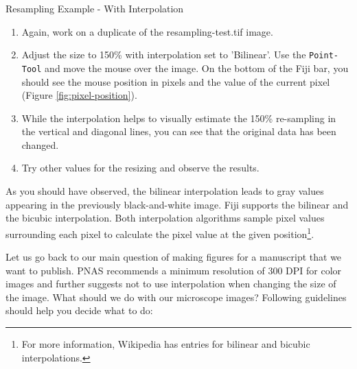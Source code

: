 \newpage
\begin{taskbox}{Resampling Example - With Interpolation}

\begin{enumerate}
	\item Again, work on a duplicate of the resampling-test.tif image.
	\item Adjust the size to 150\% with interpolation set to 'Bilinear'. Use the \texttt{Point-Tool} and move the mouse over the image. On the bottom of the Fiji bar, you should see the mouse position in pixels and the value of the current pixel (Figure \ref{fig:pixel-position}).
	
	\begin{minipage}[t]{\linewidth}
		\begin{center}
		\medskip
		\label{fig:pixel-position}
		\end{center}
	\end{minipage}
	
	\item While the interpolation helps to visually estimate the 150\% re-sampling in the vertical and diagonal lines, you can see that the original data has been changed.
	\item Try other values for the resizing and observe the results.
\end{enumerate}
\end{taskbox}

As you should have observed, the bilinear interpolation leads to gray values appearing in the previously black-and-white image. Fiji supports the bilinear and the bicubic interpolation. Both interpolation algorithms sample pixel values surrounding each pixel to calculate the pixel value at the given position\footnote{For more information, Wikipedia has entries for bilinear and bicubic interpolations.}. 

Let us go back to our main question of making figures for a manuscript that we want to publish. PNAS recommends a minimum resolution of 300 DPI for color images and further suggests not to use interpolation when changing the size of the image. What should we do with our microscope images? Following guidelines should help you decide what to do:

